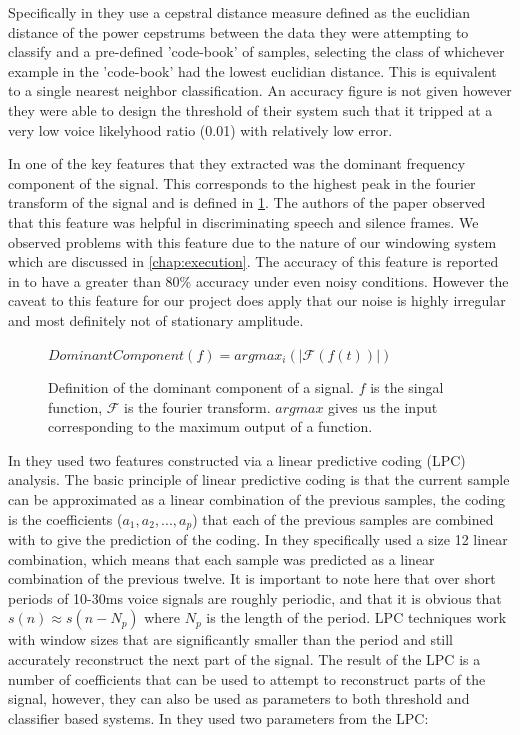 \documentclass[ %
                    author={Sam Phippen},
                supervisor={Dr. Rafal Bogacz},
                     title={Real time voice activity detectors in noisy personal computing environments},
                  subtitle={},
                    degree={MEng},
                      year={2012} ]{thesis}
\begin{document}
Specifically in \cite{haigh} they use a cepstral distance measure defined as
the euclidian distance of the power cepstrums between the data they were
attempting to classify and a pre-defined 'code-book' of samples, selecting the
class of whichever example in the 'code-book' had the lowest euclidian
distance. This is equivalent to a single nearest neighbor classification. An
accuracy figure is not given however they were able to design the threshold of
their system such that it tripped at a very low voice likelyhood ratio (0.01) with
relatively low error.

In \cite{moattar} one of the key features that they extracted was the dominant
frequency component of the signal. This corresponds to the highest peak in the
fourier transform of the signal and is defined in \ref{eqn:dom-freq}. The
authors of the paper observed that this feature was helpful in discriminating
speech and silence frames. We observed problems with this feature due to the
nature of our windowing system which are discussed in \ref{chap:execution}. The
accuracy of this feature is reported in \cite{moattar} to have a greater than
80\% accuracy under even noisy conditions. However the caveat to this feature
for our project does apply that our noise is highly irregular and most
definitely not of stationary amplitude.

\begin{figure}
    $DominantComponent(f) = argmax_i(|\mathcal{F}(f(t))|)$
    \caption{Definition of the dominant component of a signal. $f$ is the singal
        function, $\mathcal{F}$ is the fourier transform. $argmax$ gives us the
        input corresponding to the maximum output of a function.}
    \label{eqn:dom-freq}
\end{figure}

In \cite{atal} they used two features constructed via a linear predictive
coding (LPC) analysis. The basic principle of linear predictive coding is that
the current sample can be approximated as a linear combination of the previous
samples\cite{rabiner}, the coding is the coefficients ($a_1,a_2,...,a_p$) that
each of the previous samples are combined with to give the prediction of the
coding. In \cite{atal} they specifically used a size 12 linear combination,
which means that each sample was predicted as a linear combination of the
previous twelve. It is important to note here that over short periods of
10-30ms voice signals are roughly periodic, and that it is obvious that $s(n)
\approx s(n-N_p)$ where $N_p$ is the length of the period. LPC techniques work
with window sizes that are significantly smaller than the period and still
accurately reconstruct the next part of the signal. The result of the LPC is a
number of coefficients that can be used to attempt to reconstruct parts of the
signal, however, they can also be used as parameters to both threshold and
classifier based systems. In \cite{atal} they used two parameters from the LPC:
\end{document}
